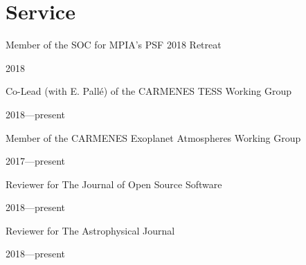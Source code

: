 \documentclass[12pt, a4paper]{article} %
\begin{document}
\section*{Service}

\begin{minipage}[t]{0.7\textwidth}
\begin{flushleft}%
  \setlength{\leftskip}{0.2cm}%
Member of the SOC for MPIA's PSF 2018 Retreat 
\end{flushleft}
\end{minipage}
\begin{minipage}[t]{0.3\textwidth}
\hfill 2018
\end{minipage}

\begin{minipage}[t]{0.7\textwidth}
\begin{flushleft}%
  \setlength{\leftskip}{0.2cm}%
Co-Lead (with E. Pall\'e) of the CARMENES TESS Working Group 
\end{flushleft}
\end{minipage}
\begin{minipage}[t]{0.3\textwidth}
\hfill 2018---present
\end{minipage}

\begin{minipage}[t]{0.7\textwidth}
\begin{flushleft}%
  \setlength{\leftskip}{0.2cm}%
Member of the CARMENES Exoplanet Atmospheres Working Group 
\end{flushleft}
\end{minipage}
\begin{minipage}[t]{0.3\textwidth}
\hfill 2017---present
\end{minipage}

\begin{minipage}[t]{0.7\textwidth}
\begin{flushleft}%
  \setlength{\leftskip}{0.2cm}%
Reviewer for The Journal of Open Source Software
\end{flushleft}
\end{minipage}
\begin{minipage}[t]{0.3\textwidth}
\hfill 2018---present
\end{minipage}

\begin{minipage}[t]{0.7\textwidth}
\begin{flushleft}%
  \setlength{\leftskip}{0.2cm}%
Reviewer for The Astrophysical Journal
\end{flushleft}
\end{minipage}
\begin{minipage}[t]{0.3\textwidth}
\hfill 2018---present
\end{minipage}
\end{document}

